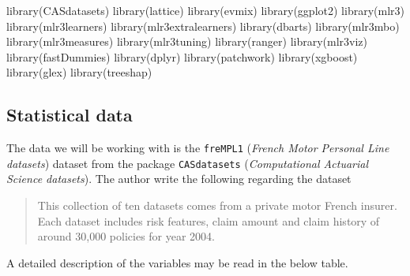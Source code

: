 \documentclass[
]{article}
\newenvironment{Shaded}{\begin{snugshade}}{\end{snugshade}}
\newcommand{\FunctionTok}[1]{\textcolor[rgb]{0.00,0.00,0.00}{#1}}
\newcommand{\NormalTok}[1]{#1}
\begin{document}
\begin{Shaded}
\begin{Highlighting}[]
\FunctionTok{library}\NormalTok{(CASdatasets)}
\FunctionTok{library}\NormalTok{(lattice)}
\FunctionTok{library}\NormalTok{(evmix)}
\FunctionTok{library}\NormalTok{(ggplot2)}
\FunctionTok{library}\NormalTok{(mlr3)}
\FunctionTok{library}\NormalTok{(mlr3learners)}
\FunctionTok{library}\NormalTok{(mlr3extralearners)}
\FunctionTok{library}\NormalTok{(dbarts)}
\FunctionTok{library}\NormalTok{(mlr3mbo)}
\FunctionTok{library}\NormalTok{(mlr3measures)}
\FunctionTok{library}\NormalTok{(mlr3tuning)}
\FunctionTok{library}\NormalTok{(ranger)}
\FunctionTok{library}\NormalTok{(mlr3viz)}
\FunctionTok{library}\NormalTok{(fastDummies)}
\FunctionTok{library}\NormalTok{(dplyr)}
\FunctionTok{library}\NormalTok{(patchwork)}
\FunctionTok{library}\NormalTok{(xgboost)}
\FunctionTok{library}\NormalTok{(glex)}
\FunctionTok{library}\NormalTok{(treeshap)}
\end{Highlighting}
\end{Shaded}

\hypertarget{statistical-data}{%
\subsection{Statistical data}\label{statistical-data}}

The data we will be working with is the \texttt{freMPL1} (\emph{French
Motor Personal Line datasets}) dataset from the package
\texttt{CASdatasets} (\emph{Computational Actuarial Science datasets}).
The author write the following regarding the dataset

\begin{quote}
This collection of ten datasets comes from a private motor French
insurer. Each dataset includes risk features, claim amount and claim
history of around 30,000 policies for year 2004.
\end{quote}

A detailed description of the variables may be read in the below table.
\end{document}
